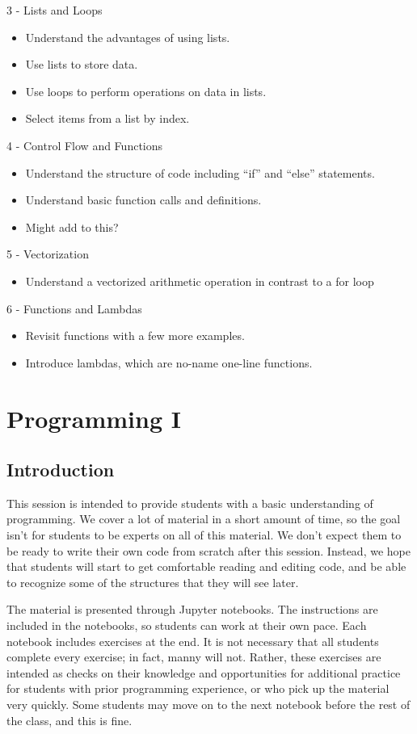 \documentclass[11pt]{article}
\begin{document}
3 - Lists and Loops
\begin{itemize}
\item Understand the advantages of using lists.
\item Use lists to store data.
\item Use loops to perform operations on data in lists.
\item Select items from a list by index.
\end{itemize}

4 - Control Flow and Functions
\begin{itemize}
\item Understand the structure of code including ``if'' and ``else'' statements.
\item Understand basic function calls and definitions.
\item {\color{red} Might add to this?}
\end{itemize}

5 - Vectorization 
\begin{itemize}
\item Understand a vectorized arithmetic operation in contrast to a for loop
\end{itemize}

6 - Functions and Lambdas
\begin{itemize}
\item Revisit functions with a few more examples.
\item Introduce lambdas, which are no-name one-line functions.
\end{itemize}

\section*{Programming I}

\subsection*{Introduction}

This session is intended to provide students with a basic understanding of programming. We cover a lot of material in a short amount of time, so the goal isn't for students to be experts on all of this material. We don't expect them to be ready to write their own code from scratch after this session. Instead, we hope that students will start to get comfortable reading and editing code, and be able to recognize some of the structures that they will see later.

The material is presented through Jupyter notebooks. The instructions are included in the notebooks, so students can work at their own pace. Each notebook includes exercises at the end. It is not necessary that all students complete every exercise; in fact, manny will not. Rather, these exercises are intended as checks on their knowledge and opportunities for additional practice for students with prior programming experience, or who pick up the material very quickly. Some students may move on to the next notebook before the rest of the class, and this is fine.
\end{document}
